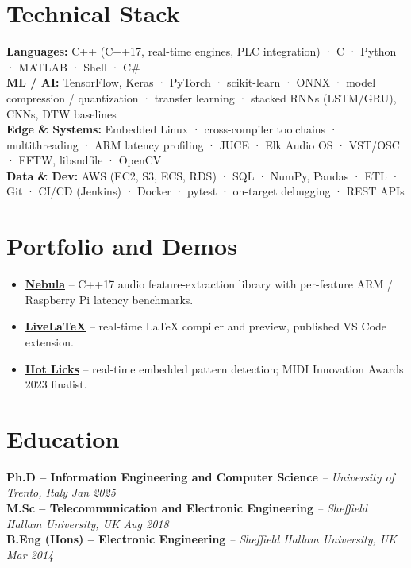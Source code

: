 \documentclass[11pt]{article}
\begin{document}
\section*{Technical Stack}

\textbf{Languages:} C++ (C++17, real-time engines, PLC integration) · C · Python · MATLAB · Shell · C\#\\
\textbf{ML / AI:} TensorFlow, Keras · PyTorch · scikit-learn · ONNX · model compression / quantization · transfer learning · stacked RNNs (LSTM/GRU), CNNs, DTW baselines\\
\textbf{Edge \& Systems:} Embedded Linux · cross-compiler toolchains · multithreading · ARM latency profiling · JUCE · Elk Audio OS · VST/OSC · FFTW, libsndfile · OpenCV\\
\textbf{Data \& Dev:} AWS (EC2, S3, ECS, RDS) · SQL · NumPy, Pandas · ETL · Git · CI/CD (Jenkins) · Docker · pytest · on-target debugging · REST APIs

\section*{Portfolio and Demos \footnotesize {}}
\begin{itemize}[leftmargin=1.2em, itemsep=-0.25em]
    \item \href{https://github.com/ns2max/nebula}{\textbf{Nebula}} -- C++17 audio feature-extraction library with per-feature ARM / Raspberry Pi latency benchmarks.
    \item \href{https://marketplace.visualstudio.com/items?itemName=ns2max.livelatex}{\textbf{LiveLaTeX}} -- real-time LaTeX compiler and preview, published VS Code extension.
    \item \href{https://youtu.be/gkOqfOT8zXM}{\textbf{Hot Licks}} -- real-time embedded pattern detection; MIDI Innovation Awards 2023 finalist.
\end{itemize}

\section*{Education}
\textbf{Ph.D -- Information Engineering and Computer Science} \textit{\small{ -- University of Trento, Italy}} \hfill \textit{Jan 2025}\\[2pt]
\noindent\textbf{M.Sc -- Telecommunication and Electronic Engineering} \textit{\small{ -- Sheffield Hallam University, UK}} \hfill \textit{Aug 2018}\\[2pt]
\noindent\textbf{B.Eng (Hons) -- Electronic Engineering} \textit{\small{ -- Sheffield Hallam University, UK}} \hfill \textit{Mar 2014}
\end{document}
